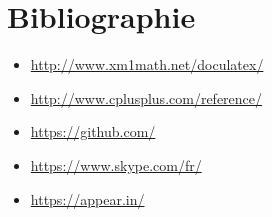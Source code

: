 \documentclass{article}
\begin{document}
\section{\LARGE Bibliographie}
\begin{itemize}
    \item \url{http://www.xm1math.net/doculatex/}
    \item \url{http://www.cplusplus.com/reference/}
    \item \url{https://github.com/}
    \item \url{https://www.skype.com/fr/}
    \item \url{https://appear.in/}
\end{itemize}
\end{document}
